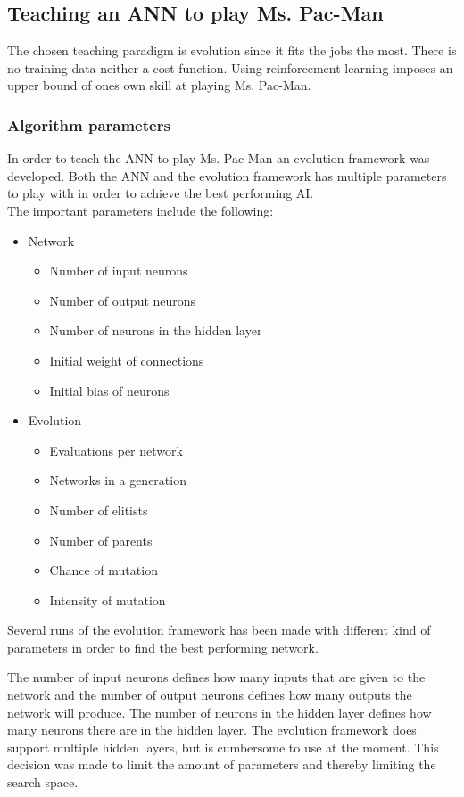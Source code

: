 \subsection{Teaching an ANN to play Ms. Pac-Man}
The chosen teaching paradigm is evolution since it fits the jobs the most. There is no training data neither a cost function. Using reinforcement learning imposes an upper bound of ones own skill at playing Ms. Pac-Man.

\subsubsection{Algorithm parameters}
In order to teach the ANN to play Ms. Pac-Man an evolution framework was developed. Both the ANN and the evolution framework has multiple parameters to play with in order to achieve the best performing AI. \\

\noindent The important parameters include the following:

\begin{itemize}
	\item Network
	\begin{itemize}
		\item Number of input neurons
		\item Number of output neurons
		\item Number of neurons in the hidden layer
		\item Initial weight of connections
		\item Initial bias of neurons
	\end{itemize}
	
	\item Evolution
	\begin{itemize}
		\item Evaluations per network
		\item Networks in a generation
		\item Number of elitists
		\item Number of parents
		\item Chance of mutation
		\item Intensity of mutation
	\end{itemize}
\end{itemize}

\noindent Several runs of the evolution framework has been made with different kind of parameters in order to find the best performing network.

The number of input neurons defines how many inputs that are given to the network and the number of output neurons defines how many outputs the network will produce. The number of neurons in the hidden layer defines how many neurons there are in the hidden layer. The evolution framework does support multiple hidden layers, but is cumbersome to use at the moment. This decision was made to limit the amount of parameters and thereby limiting the search space.

